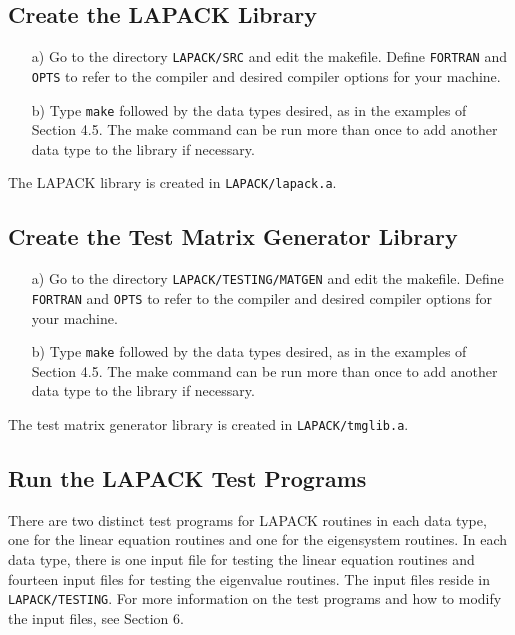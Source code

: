\subsection{Create the LAPACK Library}

\begin{itemize}
\item[a)]
Go to the directory {\tt LAPACK/SRC} and edit the makefile. 
Define {\tt FORTRAN} and {\tt OPTS} to refer to the 
compiler and desired compiler options for your machine.

\item[b)]
Type {\tt make} followed by the data types desired, as in the examples
of Section 4.5.
The make command can be run more than once to add another
data type to the library if necessary.  

\end{itemize}

\noindent
The LAPACK library is created in {\tt LAPACK/lapack.a}.

\subsection{Create the Test Matrix Generator Library}

\begin{itemize}
\item[a)]
Go to the directory {\tt LAPACK/TESTING/MATGEN} and edit the makefile. 
Define {\tt FORTRAN} and {\tt OPTS} to refer to the 
compiler and desired compiler options for your machine.

\item[b)]
Type {\tt make} followed by the data types desired, as in the examples
of Section 4.5.
The make command can be run more than once to add another
data type to the library if necessary.  

\end{itemize}

\noindent
The test matrix generator library is created in {\tt LAPACK/tmglib.a}.

\subsection{Run the LAPACK Test Programs}

\dent
There are two distinct test programs for LAPACK routines
in each data type, one for the linear equation routines and
one for the eigensystem routines.
In each data type, there is one input file for testing the linear
equation routines and fourteen input files for testing the eigenvalue
routines.
The input files reside in {\tt LAPACK/TESTING}.
For more information on the test programs and how to modify the
input files, see Section 6.

